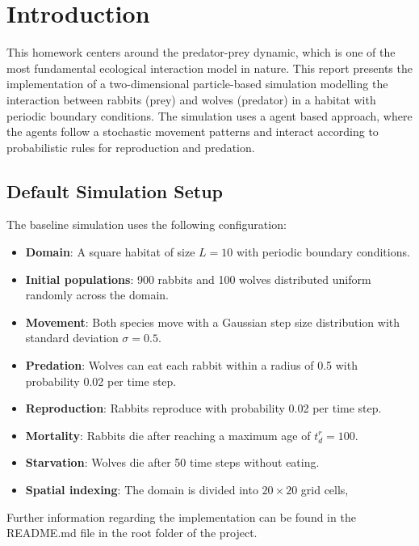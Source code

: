 \section*{Introduction}
This homework centers around the predator-prey dynamic, which is one of the most fundamental ecological interaction model in nature.
This report presents the implementation of a two-dimensional particle-based simulation modelling the interaction between rabbits (prey) and wolves (predator) in a habitat with periodic boundary conditions.
The simulation uses a agent based approach, where the agents follow a stochastic movement patterns and interact according to probabilistic rules for reproduction and predation.

\subsection*{Default Simulation Setup}
The baseline simulation uses the following configuration:
\begin{itemize}
\item \textbf{Domain}: A square habitat of size $L = 10$ with periodic boundary conditions.
\item \textbf{Initial populations}: 900 rabbits and 100 wolves distributed uniform randomly across the domain.
\item \textbf{Movement}: Both species move with a Gaussian step size distribution with standard deviation $\sigma = 0.5$.
\item \textbf{Predation}: Wolves can eat each rabbit within a radius of 0.5 with probability 0.02 per time step.
\item \textbf{Reproduction}: Rabbits reproduce with probability 0.02 per time step.
\item \textbf{Mortality}: Rabbits die after reaching a maximum age of $t_d^r = 100$.
\item \textbf{Starvation}: Wolves die after 50 time steps without eating.
\item \textbf{Spatial indexing}: The domain is divided into $20 \times 20$ grid cells, 
\end{itemize}
Further information regarding the implementation can be found in the README.md file in the root folder of the project.

